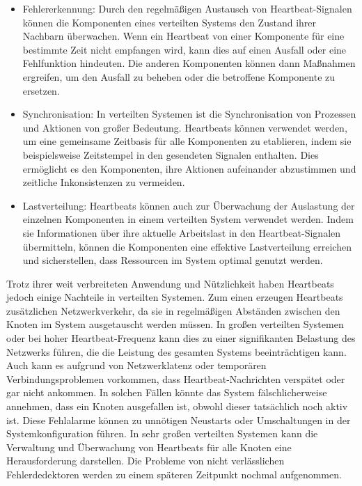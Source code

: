 \documentclass[../vs-script-first-v01.tex]{subfiles}
\begin{document}
\begin{itemize}
\item Fehlererkennung: Durch den regelmäßigen Austausch von Heartbeat-Signalen können die Komponenten eines verteilten Systems den Zustand ihrer Nachbarn überwachen. Wenn ein Heartbeat von einer Komponente für eine bestimmte Zeit nicht empfangen wird, kann dies auf einen Ausfall oder eine Fehlfunktion hindeuten. Die anderen Komponenten können dann Maßnahmen ergreifen, um den Ausfall zu beheben oder die betroffene Komponente zu ersetzen.
\item Synchronisation: In verteilten Systemen ist die Synchronisation von Prozessen und Aktionen von großer Bedeutung. Heartbeats können verwendet werden, um eine gemeinsame Zeitbasis für alle Komponenten zu etablieren, indem sie beispielsweise Zeitstempel in den gesendeten Signalen enthalten. Dies ermöglicht es den Komponenten, ihre Aktionen aufeinander abzustimmen und zeitliche Inkonsistenzen zu vermeiden.
\item Lastverteilung: Heartbeats können auch zur Überwachung der Auslastung der einzelnen Komponenten in einem verteilten System verwendet werden. Indem sie Informationen über ihre aktuelle Arbeitslast in den Heartbeat-Signalen übermitteln, können die Komponenten eine effektive Lastverteilung erreichen und sicherstellen, dass Ressourcen im System optimal genutzt werden.
\end{itemize}
Trotz ihrer weit verbreiteten Anwendung und Nützlichkeit haben Heartbeats jedoch einige Nachteile in verteilten Systemen. Zum einen erzeugen Heartbeats zusätzlichen Netzwerkverkehr, da sie in regelmäßigen Abständen zwischen den Knoten im System ausgetauscht werden müssen. In großen verteilten Systemen oder bei hoher Heartbeat-Frequenz kann dies zu einer signifikanten Belastung des Netzwerks führen, die die Leistung des gesamten Systems beeinträchtigen kann. Auch kann es aufgrund von Netzwerklatenz oder temporären Verbindungsproblemen vorkommen, dass Heartbeat-Nachrichten verspätet oder gar nicht ankommen. In solchen Fällen könnte das System fälschlicherweise annehmen, dass ein Knoten ausgefallen ist, obwohl dieser tatsächlich noch aktiv ist. Diese Fehlalarme können zu unnötigen Neustarts oder Umschaltungen in der Systemkonfiguration führen.
In sehr großen verteilten Systemen kann die Verwaltung und Überwachung von Heartbeats für alle Knoten eine Herausforderung darstellen.
Die Probleme von nicht verlässlichen Fehlerdedektoren werden zu einem späteren Zeitpunkt nochmal aufgenommen. 
\\\\
\end{document}
